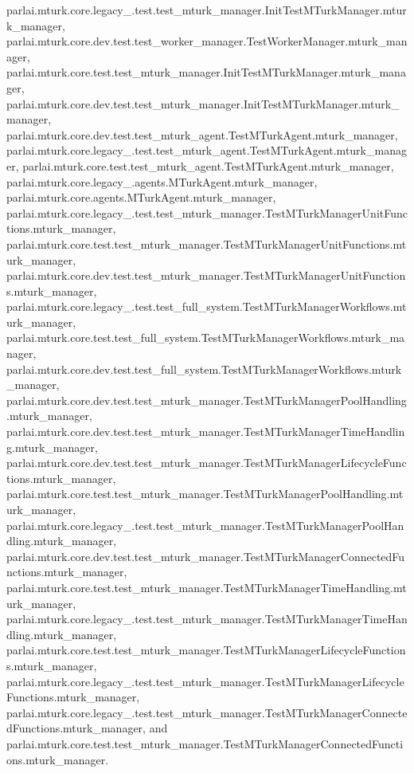 parlai.\+mturk.\+core.\+legacy\+\_.\+test.\+test\+\_\+mturk\+\_\+manager.\+Init\+Test\+M\+Turk\+Manager.\+mturk\+\_\+manager, parlai.\+mturk.\+core.\+dev.\+test.\+test\+\_\+worker\+\_\+manager.\+Test\+Worker\+Manager.\+mturk\+\_\+manager, parlai.\+mturk.\+core.\+test.\+test\+\_\+mturk\+\_\+manager.\+Init\+Test\+M\+Turk\+Manager.\+mturk\+\_\+manager, parlai.\+mturk.\+core.\+dev.\+test.\+test\+\_\+mturk\+\_\+manager.\+Init\+Test\+M\+Turk\+Manager.\+mturk\+\_\+manager, parlai.\+mturk.\+core.\+dev.\+test.\+test\+\_\+mturk\+\_\+agent.\+Test\+M\+Turk\+Agent.\+mturk\+\_\+manager, parlai.\+mturk.\+core.\+legacy\+\_.\+test.\+test\+\_\+mturk\+\_\+agent.\+Test\+M\+Turk\+Agent.\+mturk\+\_\+manager, parlai.\+mturk.\+core.\+test.\+test\+\_\+mturk\+\_\+agent.\+Test\+M\+Turk\+Agent.\+mturk\+\_\+manager, parlai.\+mturk.\+core.\+legacy\+\_.\+agents.\+M\+Turk\+Agent.\+mturk\+\_\+manager, parlai.\+mturk.\+core.\+agents.\+M\+Turk\+Agent.\+mturk\+\_\+manager, parlai.\+mturk.\+core.\+legacy\+\_.\+test.\+test\+\_\+mturk\+\_\+manager.\+Test\+M\+Turk\+Manager\+Unit\+Functions.\+mturk\+\_\+manager, parlai.\+mturk.\+core.\+test.\+test\+\_\+mturk\+\_\+manager.\+Test\+M\+Turk\+Manager\+Unit\+Functions.\+mturk\+\_\+manager, parlai.\+mturk.\+core.\+dev.\+test.\+test\+\_\+mturk\+\_\+manager.\+Test\+M\+Turk\+Manager\+Unit\+Functions.\+mturk\+\_\+manager, parlai.\+mturk.\+core.\+legacy\+\_.\+test.\+test\+\_\+full\+\_\+system.\+Test\+M\+Turk\+Manager\+Workflows.\+mturk\+\_\+manager, parlai.\+mturk.\+core.\+test.\+test\+\_\+full\+\_\+system.\+Test\+M\+Turk\+Manager\+Workflows.\+mturk\+\_\+manager, parlai.\+mturk.\+core.\+dev.\+test.\+test\+\_\+full\+\_\+system.\+Test\+M\+Turk\+Manager\+Workflows.\+mturk\+\_\+manager, parlai.\+mturk.\+core.\+dev.\+test.\+test\+\_\+mturk\+\_\+manager.\+Test\+M\+Turk\+Manager\+Pool\+Handling.\+mturk\+\_\+manager, parlai.\+mturk.\+core.\+dev.\+test.\+test\+\_\+mturk\+\_\+manager.\+Test\+M\+Turk\+Manager\+Time\+Handling.\+mturk\+\_\+manager, parlai.\+mturk.\+core.\+dev.\+test.\+test\+\_\+mturk\+\_\+manager.\+Test\+M\+Turk\+Manager\+Lifecycle\+Functions.\+mturk\+\_\+manager, parlai.\+mturk.\+core.\+test.\+test\+\_\+mturk\+\_\+manager.\+Test\+M\+Turk\+Manager\+Pool\+Handling.\+mturk\+\_\+manager, parlai.\+mturk.\+core.\+legacy\+\_.\+test.\+test\+\_\+mturk\+\_\+manager.\+Test\+M\+Turk\+Manager\+Pool\+Handling.\+mturk\+\_\+manager, parlai.\+mturk.\+core.\+dev.\+test.\+test\+\_\+mturk\+\_\+manager.\+Test\+M\+Turk\+Manager\+Connected\+Functions.\+mturk\+\_\+manager, parlai.\+mturk.\+core.\+test.\+test\+\_\+mturk\+\_\+manager.\+Test\+M\+Turk\+Manager\+Time\+Handling.\+mturk\+\_\+manager, parlai.\+mturk.\+core.\+legacy\+\_.\+test.\+test\+\_\+mturk\+\_\+manager.\+Test\+M\+Turk\+Manager\+Time\+Handling.\+mturk\+\_\+manager, parlai.\+mturk.\+core.\+test.\+test\+\_\+mturk\+\_\+manager.\+Test\+M\+Turk\+Manager\+Lifecycle\+Functions.\+mturk\+\_\+manager, parlai.\+mturk.\+core.\+legacy\+\_.\+test.\+test\+\_\+mturk\+\_\+manager.\+Test\+M\+Turk\+Manager\+Lifecycle\+Functions.\+mturk\+\_\+manager, parlai.\+mturk.\+core.\+legacy\+\_.\+test.\+test\+\_\+mturk\+\_\+manager.\+Test\+M\+Turk\+Manager\+Connected\+Functions.\+mturk\+\_\+manager, and parlai.\+mturk.\+core.\+test.\+test\+\_\+mturk\+\_\+manager.\+Test\+M\+Turk\+Manager\+Connected\+Functions.\+mturk\+\_\+manager.

